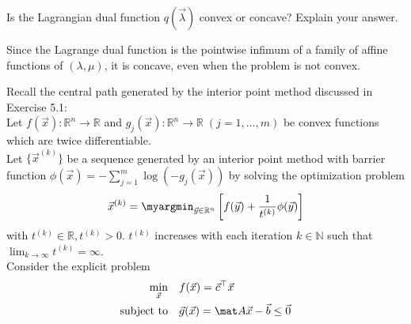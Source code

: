 \begin{exercise}[subtitle={Bonus: Paper}]
Is the Lagrangian dual function $q(\vec \lambda)$ convex or concave? Explain your answer.
\end{exercise}

\begin{solution}[print=false]
Since the Lagrange dual function is the pointwise infimum of a family of affine functions of $(\lambda, \mu)$, it is
concave, even when the problem is not convex.
\end{solution}


\begin{exercise}[subtitle={Paper}]
Recall the central path generated by the interior point method discussed in Exercise 5.1: \\
Let $f(\vec{x}): \mathbb{R}^n \rightarrow \mathbb{R}$ and $g_j(\vec{x}): \mathbb{R}^n \rightarrow \mathbb{R}\; (j = 1,\dots, m)$ be convex functions which are twice differentiable.\\
 Let $\{\vec{x}^{(k)}\}$ be a sequence generated by an interior point method with barrier function $\phi(\vec{x}) = -\sum_{j = 1}^m\log\left(-g_j(\vec{x})\right)$ by solving the optimization problem
\begin{equation}
\vec{x}^{(k)} = \myargmin_{\vec{y}\in \mathbb{R}^n}\left[f(\vec{y}) + \frac{1}{t^{(k)}}\phi(\vec{y})\right]
\label{eq:central_path}
\end{equation}
with $t^{(k)} \in \mathbb{R}, t^{(k)} > 0$. $t^{(k)}$ increases with each iteration $k \in \mathbb{N}$ such that $\lim_{k\rightarrow\infty} t^{(k)} = \infty$.\\
Consider the explicit problem   \begin{align*}
    \min_{\vec x} \quad & f(\vec x) = \vec{c}^{\top} \vec{x}\\
    \text{subject to} \quad & \vec g(\vec x) =  \mat A \vec{x} - \vec{b} \leq \vec{0}
  \end{align*}


\end{exercise}

